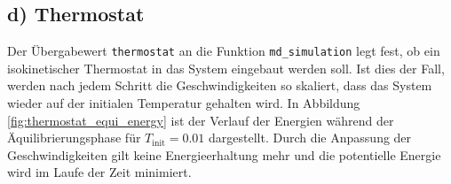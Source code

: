 %
%
\subsection*{d) Thermostat}



Der Übergabewert \texttt{thermostat} an die Funktion \texttt{md\_simulation} legt fest,
ob ein isokinetischer Thermostat in das System eingebaut werden soll.
Ist dies der Fall, werden nach jedem Schritt die Geschwindigkeiten so skaliert, dass
das System wieder auf der initialen Temperatur gehalten wird.
In Abbildung \ref{fig:thermostat_equi_energy} ist der Verlauf der Energien während der
Äquilibrierungsphase für $T_\text{init} = 0.01$ dargestellt.
Durch die Anpassung der Geschwindigkeiten gilt keine Energieerhaltung mehr
und die potentielle Energie wird im Laufe der Zeit minimiert.

